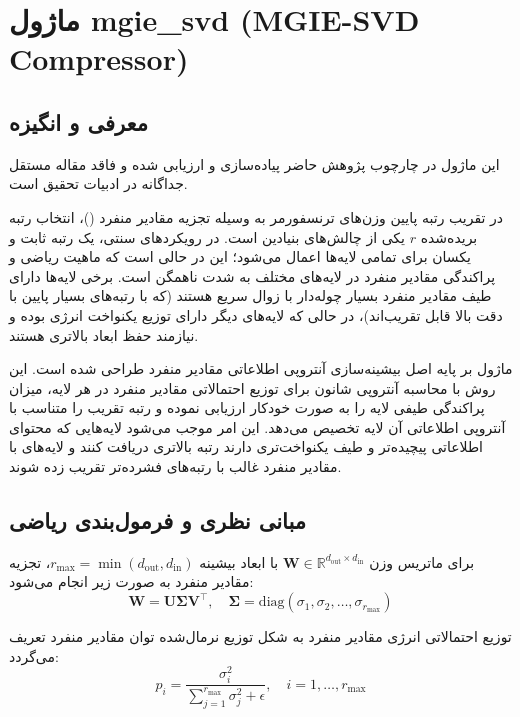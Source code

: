 \section{ماژول mgie\_svd (MGIE-SVD Compressor)}
\label{sec:module_mgie_svd}

\subsection{معرفی و انگیزه}
این ماژول در چارچوب پژوهش حاضر پیاده‌سازی و ارزیابی شده و فاقد مقاله مستقل جداگانه در ادبیات تحقیق است.

در تقریب رتبه پایین وزن‌های ترنسفورمر به وسیله تجزیه مقادیر منفرد ()، انتخاب رتبه بریده‌شده $r$ یکی از چالش‌های بنیادین است. در رویکردهای سنتی، یک رتبه ثابت و یکسان برای تمامی لایه‌ها اعمال می‌شود؛ این در حالی است که ماهیت ریاضی و پراکندگی مقادیر منفرد در لایه‌های مختلف به شدت ناهمگن است. برخی لایه‌ها دارای طیف مقادیر منفرد بسیار چوله‌دار با زوال سریع هستند (که با رتبه‌های بسیار پایین با دقت بالا قابل تقریب‌اند)، در حالی که لایه‌های دیگر دارای توزیع یکنواخت انرژی بوده و نیازمند حفظ ابعاد بالاتری هستند.

ماژول  بر پایه اصل بیشینه‌سازی آنتروپی اطلاعاتی مقادیر منفرد طراحی شده است. این روش با محاسبه آنتروپی شانون برای توزیع احتمالاتی مقادیر منفرد در هر لایه، میزان پراکندگی طیفی لایه را به صورت خودکار ارزیابی نموده و رتبه تقریب را متناسب با آنتروپی اطلاعاتی آن لایه تخصیص می‌دهد. این امر موجب می‌شود لایه‌هایی که محتوای اطلاعاتی پیچیده‌تر و طیف یکنواخت‌تری دارند رتبه بالاتری دریافت کنند و لایه‌های با مقادیر منفرد غالب با رتبه‌های فشرده‌تر تقریب زده شوند.

\subsection{مبانی نظری و فرمول‌بندی ریاضی}
برای ماتریس وزن $\mathbf{W} \in \mathbb{R}^{d_{\text{out}} \times d_{\text{in}}}$ با ابعاد بیشینه $r_{\text{max}} = \min(d_{\text{out}}, d_{\text{in}})$، تجزیه مقادیر منفرد به صورت زیر انجام می‌شود:
\begin{equation}
\mathbf{W} = \mathbf{U} \mathbf{\Sigma} \mathbf{V}^\top, \quad \mathbf{\Sigma} = \text{diag}(\sigma_1, \sigma_2, \dots, \sigma_{r_{\text{max}}})
\end{equation}

توزیع احتمالاتی انرژی مقادیر منفرد به شکل توزیع نرمال‌شده توان مقادیر منفرد تعریف می‌گردد:
\begin{equation}
p_i = \frac{\sigma_i^2}{\sum_{j=1}^{r_{\text{max}}} \sigma_j^2 + \epsilon}, \quad i = 1, \dots, r_{\text{max}}
\end{equation}

